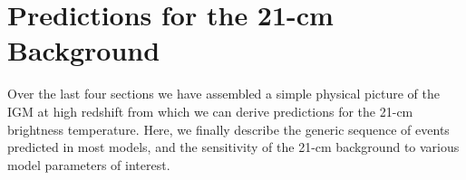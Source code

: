 %











\section{Predictions for the 21-cm Background} \label{sec:predictions}
Over the last four sections we have assembled a simple physical picture of the IGM at high redshift from which we can derive predictions for the 21-cm brightness temperature. Here, we finally describe the generic sequence of events predicted in most models, and the sensitivity of the 21-cm background to various model parameters of interest. 

